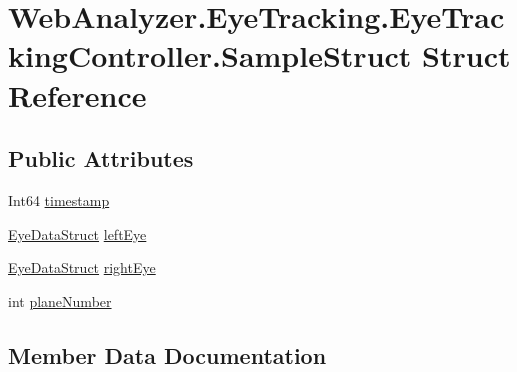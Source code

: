 \hypertarget{struct_web_analyzer_1_1_eye_tracking_1_1_eye_tracking_controller_1_1_sample_struct}{}\section{Web\+Analyzer.\+Eye\+Tracking.\+Eye\+Tracking\+Controller.\+Sample\+Struct Struct Reference}
\label{struct_web_analyzer_1_1_eye_tracking_1_1_eye_tracking_controller_1_1_sample_struct}
\subsection*{Public Attributes}
\begin{DoxyCompactItemize}
\item 
Int64 \hyperlink{struct_web_analyzer_1_1_eye_tracking_1_1_eye_tracking_controller_1_1_sample_struct_aaaee2bfebc20de6cd2ec0b47d0e77e70}{timestamp}
\item 
\hyperlink{struct_web_analyzer_1_1_eye_tracking_1_1_eye_tracking_controller_1_1_eye_data_struct}{Eye\+Data\+Struct} \hyperlink{struct_web_analyzer_1_1_eye_tracking_1_1_eye_tracking_controller_1_1_sample_struct_ae434828789507d1a7bf777b32e0a98eb}{left\+Eye}
\item 
\hyperlink{struct_web_analyzer_1_1_eye_tracking_1_1_eye_tracking_controller_1_1_eye_data_struct}{Eye\+Data\+Struct} \hyperlink{struct_web_analyzer_1_1_eye_tracking_1_1_eye_tracking_controller_1_1_sample_struct_a384d453f797e23a970e6862fb049d560}{right\+Eye}
\item 
int \hyperlink{struct_web_analyzer_1_1_eye_tracking_1_1_eye_tracking_controller_1_1_sample_struct_a7f4dcd623f5741906d65b68d6ec7e64a}{plane\+Number}
\end{DoxyCompactItemize}


\subsection{Member Data Documentation}
\hypertarget{struct_web_analyzer_1_1_eye_tracking_1_1_eye_tracking_controller_1_1_sample_struct_ae434828789507d1a7bf777b32e0a98eb}{}
